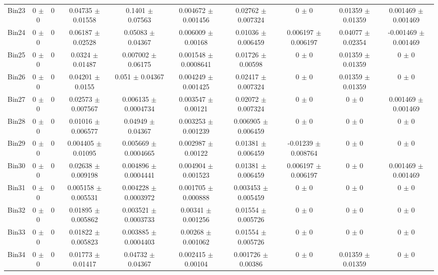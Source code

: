 \begin{tabular}{@{\extracolsep{4pt}}lccccccccc@{}}
     Bin23 & 0 $\pm$ 0 & 0 & 0.04735 $\pm$ 0.01558 & 0.1401 $\pm$ 0.07563 & 0.004672 $\pm$ 0.001456 & 0.02762 $\pm$ 0.007324 & 0 $\pm$ 0 & 0.01359 $\pm$ 0.01359 & 0.001469 $\pm$ 0.001469 \\ 
     Bin24 & 0 $\pm$ 0 & 0 & 0.06187 $\pm$ 0.02528 & 0.05083 $\pm$ 0.04367 & 0.006009 $\pm$ 0.00168 & 0.01036 $\pm$ 0.006459 & 0.006197 $\pm$ 0.006197 & 0.04077 $\pm$ 0.02354 & -0.001469 $\pm$ 0.001469 \\ 
     Bin25 & 0 $\pm$ 0 & 0 & 0.0324 $\pm$ 0.01487 & 0.007002 $\pm$ 0.06175 & 0.001548 $\pm$ 0.0008641 & 0.01726 $\pm$ 0.00598 & 0 $\pm$ 0 & 0.01359 $\pm$ 0.01359 & 0 $\pm$ 0 \\ 
     Bin26 & 0 $\pm$ 0 & 0 & 0.04201 $\pm$ 0.0155 & 0.051 $\pm$ 0.04367 & 0.004249 $\pm$ 0.001425 & 0.02417 $\pm$ 0.007324 & 0 $\pm$ 0 & 0.01359 $\pm$ 0.01359 & 0 $\pm$ 0 \\ 
     Bin27 & 0 $\pm$ 0 & 0 & 0.02573 $\pm$ 0.007567 & 0.006135 $\pm$ 0.0004734 & 0.003547 $\pm$ 0.00121 & 0.02072 $\pm$ 0.007324 & 0 $\pm$ 0 & 0 $\pm$ 0 & 0.001469 $\pm$ 0.001469 \\ 
     Bin28 & 0 $\pm$ 0 & 0 & 0.01016 $\pm$ 0.006577 & 0.04949 $\pm$ 0.04367 & 0.003253 $\pm$ 0.001239 & 0.006905 $\pm$ 0.006459 & 0 $\pm$ 0 & 0 $\pm$ 0 & 0 $\pm$ 0 \\ 
     Bin29 & 0 $\pm$ 0 & 0 & 0.004405 $\pm$ 0.01095 & 0.005669 $\pm$ 0.0004665 & 0.002987 $\pm$ 0.00122 & 0.01381 $\pm$ 0.006459 & -0.01239 $\pm$ 0.008764 & 0 $\pm$ 0 & 0 $\pm$ 0 \\ 
     Bin30 & 0 $\pm$ 0 & 0 & 0.02638 $\pm$ 0.009198 & 0.004896 $\pm$ 0.0004441 & 0.004904 $\pm$ 0.001523 & 0.01381 $\pm$ 0.006459 & 0.006197 $\pm$ 0.006197 & 0 $\pm$ 0 & 0.001469 $\pm$ 0.001469 \\ 
     Bin31 & 0 $\pm$ 0 & 0 & 0.005158 $\pm$ 0.005531 & 0.004228 $\pm$ 0.0003972 & 0.001705 $\pm$ 0.000888 & 0.003453 $\pm$ 0.005459 & 0 $\pm$ 0 & 0 $\pm$ 0 & 0 $\pm$ 0 \\ 
     Bin32 & 0 $\pm$ 0 & 0 & 0.01895 $\pm$ 0.005862 & 0.003521 $\pm$ 0.0003733 & 0.00341 $\pm$ 0.001256 & 0.01554 $\pm$ 0.005726 & 0 $\pm$ 0 & 0 $\pm$ 0 & 0 $\pm$ 0 \\ 
     Bin33 & 0 $\pm$ 0 & 0 & 0.01822 $\pm$ 0.005823 & 0.003885 $\pm$ 0.0004403 & 0.00268 $\pm$ 0.001062 & 0.01554 $\pm$ 0.005726 & 0 $\pm$ 0 & 0 $\pm$ 0 & 0 $\pm$ 0 \\ 
     Bin34 & 0 $\pm$ 0 & 0 & 0.01773 $\pm$ 0.01417 & 0.04732 $\pm$ 0.04367 & 0.002415 $\pm$ 0.00104 & 0.001726 $\pm$ 0.00386 & 0 $\pm$ 0 & 0.01359 $\pm$ 0.01359 & 0 $\pm$ 0 \\ 

\end{tabular}
